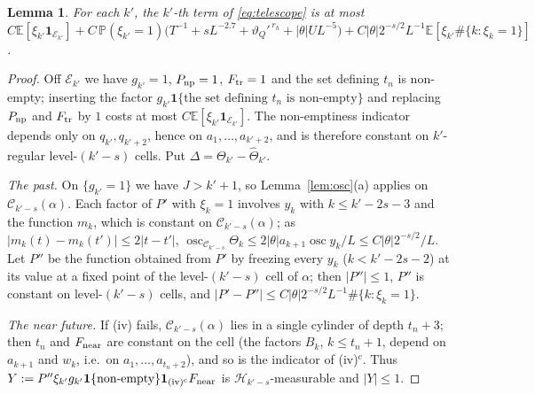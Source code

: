 \documentclass[11pt]{amsart}
\newtheorem{lemma}[theorem]{Lemma}
\theoremstyle{definition}
\numberwithin{equation}{section}
\newcommand{\E}{\mathbb{E}}
\newcommand{\Prob}{\mathbb{P}}
\newcommand{\cH}{\mathcal{H}}
\newcommand{\cC}{\mathcal{C}}
\newcommand{\ind}{\mathbf{1}}
\DeclareMathOperator{\osc}{osc}
\begin{document}
\begin{lemma}\label{lem:term}
For each $k'$, the $k'$-th term of \eqref{eq:telescope} is at most
$C\E[\xi_{k'}\ind_{\mathcal E_{k'}}]+C\,\Prob(\xi_{k'}=1)\big(T^{-1}+sL^{-2.7}+\vartheta_Q'^{\,r_h}+|\theta|UL^{-5}\big)+C|\theta|2^{-s/2}L^{-1}\E[\xi_{k'}\#\{k:\xi_k=1\}]$.
\end{lemma}

\begin{proof}
Off $\mathcal E_{k'}$ we have $g_{k'}=1$, $P_{\rm np}=1$, $F_{\rm tr}=1$ and the set defining $t_n$ is non-empty; inserting the factor
$g_{k'}\ind\{\text{the set defining }t_n\text{ is non-empty}\}$ and replacing $P_{\rm np}$ and $F_{\rm tr}$ by $1$ costs at most
$C\E[\xi_{k'}\ind_{\mathcal E_{k'}}]$. The non-emptiness indicator depends only on $q_{k'},q_{k'+2}$, hence on $a_1,\dots,a_{k'+2}$, and is
therefore constant on $k'$-regular level-$(k'-s)$ cells. Put $\Delta=\Theta_{k'}-\hat\Theta_{k'}$.

\emph{The past.} On $\{g_{k'}=1\}$ we have $J>k'+1$, so Lemma~\ref{lem:osc}(a) applies on $\cC_{k'-s}(\alpha)$. Each factor of $P'$ with $\xi_k=1$ involves
$y_k$ with $k\le k'-2s-3$ and the function $m_k$, which is constant on $\cC_{k'-s}(\alpha)$; as $|m_k(t)-m_k(t')|\le2|t-t'|$,
$\osc_{\cC_{k'-s}}\Theta_k\le2|\theta|a_{k+1}\osc y_k/L\le C|\theta|2^{-s/2}/L$. Let $P''$ be the function
obtained from $P'$ by freezing every $y_k$ ($k<k'-2s-2$) at its value at a fixed point of the level-$(k'-s)$ cell of $\alpha$; then
$|P''|\le1$, $P''$ is constant on level-$(k'-s)$ cells, and $|P'-P''|\le C|\theta|2^{-s/2}L^{-1}\#\{k:\xi_k=1\}$.

\emph{The near future.} If (iv) fails, $\cC_{k'-s}(\alpha)$ lies in a single cylinder of depth $t_n+3$; then $t_n$ and $F_{\rm near}$ are constant
on the cell (the factors $B_k$, $k\le t_n+1$, depend on $a_{k+1}$ and $w_k$, i.e.\ on $a_1,\dots,a_{t_n+2}$), and so is the indicator of (iv)$^c$. Thus
$Y:=P''\xi_{k'}g_{k'}\ind\{\text{non-empty}\}\ind_{\rm (iv)^c}F_{\rm near}$ is $\cH_{k'-s}$-measurable and $|Y|\le1$.


\end{proof}
\end{document}
